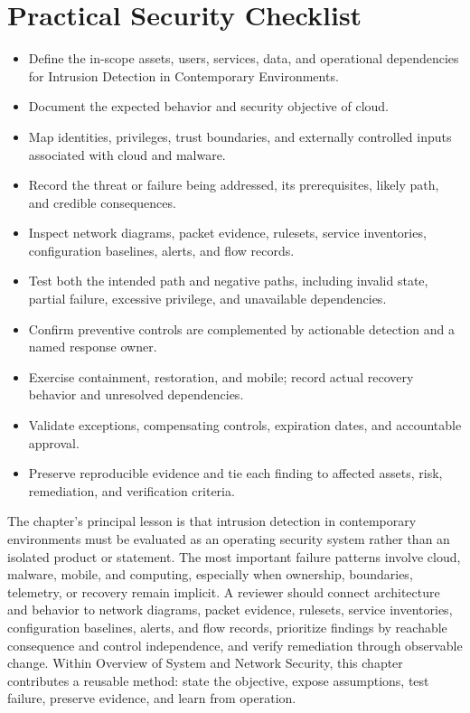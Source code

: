 \documentclass[11pt]{article}
\begin{document}
\section*{Practical Security Checklist}
\begin{itemize}[label=$\square$]
\item Define the in-scope assets, users, services, data, and operational dependencies for Intrusion Detection in Contemporary Environments.
\item Document the expected behavior and security objective of cloud.
\item Map identities, privileges, trust boundaries, and externally controlled inputs associated with cloud and malware.
\item Record the threat or failure being addressed, its prerequisites, likely path, and credible consequences.
\item Inspect network diagrams, packet evidence, rulesets, service inventories, configuration baselines, alerts, and flow records.
\item Test both the intended path and negative paths, including invalid state, partial failure, excessive privilege, and unavailable dependencies.
\item Confirm preventive controls are complemented by actionable detection and a named response owner.
\item Exercise containment, restoration, and mobile; record actual recovery behavior and unresolved dependencies.
\item Validate exceptions, compensating controls, expiration dates, and accountable approval.
\item Preserve reproducible evidence and tie each finding to affected assets, risk, remediation, and verification criteria.
\end{itemize}
\begin{synthesisbox}
The chapter's principal lesson is that intrusion detection in contemporary environments must be evaluated as an operating security system rather than an isolated product or statement. The most important failure patterns involve cloud, malware, mobile, and computing, especially when ownership, boundaries, telemetry, or recovery remain implicit. A reviewer should connect architecture and behavior to network diagrams, packet evidence, rulesets, service inventories, configuration baselines, alerts, and flow records, prioritize findings by reachable consequence and control independence, and verify remediation through observable change. Within Overview of System and Network Security, this chapter contributes a reusable method: state the objective, expose assumptions, test failure, preserve evidence, and learn from operation.
\end{synthesisbox}
\end{document}
